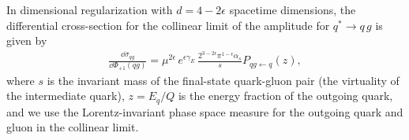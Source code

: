 


\begin{exercise}
    In dimensional regularization with \(d = 4 - 2\epsilon\) spacetime dimensions, the differential cross-section for the collinear limit of the amplitude for \(q^* \to q\,g\) is given by
    \begin{align}
        \label{eq:collinear_xsec}
        \frac{\dd \sigma_{qg}}{\dd \Phi_{+1}(qg)}
        =
        \mu^{2\epsilon}\,
        e^{\epsilon \gamma_E}
        \,
        \frac{2^{3-2\epsilon} \pi^{1-\epsilon}  \alpha_s}{s} P_{qg\leftarrow q}(z)
        ,
    \end{align}
    where \(s\) is the invariant mass of the final-state quark-gluon pair (the virtuality of the intermediate quark), \(z = E_q/Q\) is the energy fraction of the outgoing quark, and we use the Lorentz-invariant phase space measure for the outgoing quark and gluon in the collinear limit.
\end{exercise}








